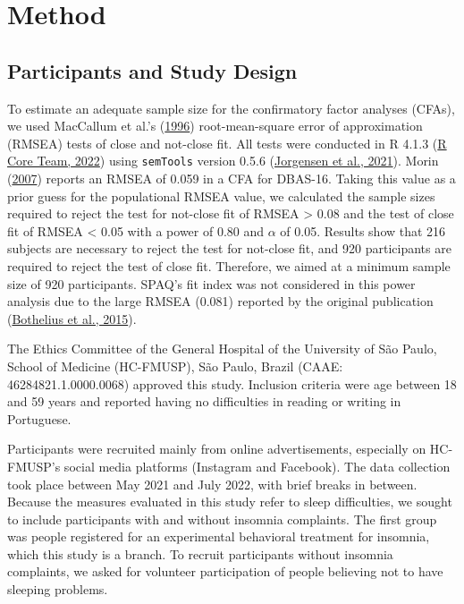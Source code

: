 \documentclass[
  ,doc,11pt, twoside,floatsintext]{apa6}
\begin{document}
\newpage

\hypertarget{method}{%
\section{Method}\label{method}}

\hypertarget{participants-and-study-design}{%
\subsection{Participants and Study Design}\label{participants-and-study-design}}

To estimate an adequate sample size for the confirmatory factor analyses (CFAs), we used MacCallum et al.'s (\protect\hyperlink{ref-maccallum1996}{1996}) root-mean-square error of approximation (RMSEA) tests of close and not-close fit. All tests were conducted in R 4.1.3 (\protect\hyperlink{ref-R-base}{R Core Team, 2022}) using \texttt{semTools} version 0.5.6 (\protect\hyperlink{ref-semtools}{Jorgensen et al., 2021}). Morin (\protect\hyperlink{ref-morin2007a}{2007}) reports an RMSEA of 0.059 in a CFA for DBAS-16. Taking this value as a prior guess for the populational RMSEA value, we calculated the sample sizes required to reject the test for not-close fit of RMSEA \textgreater{} 0.08 and the test of close fit of RMSEA \textless{} 0.05 with a power of 0.80 and \(\alpha\) of 0.05. Results show that 216 subjects are necessary to reject the test for not-close fit, and 920 participants are required to reject the test of close fit. Therefore, we aimed at a minimum sample size of 920 participants. SPAQ's fit index was not considered in this power analysis due to the large RMSEA (0.081) reported by the original publication (\protect\hyperlink{ref-bothelius2015}{Bothelius et al., 2015}).

The Ethics Committee of the General Hospital of the University of São Paulo, School of Medicine (HC-FMUSP), São Paulo, Brazil (CAAE: 46284821.1.0000.0068) approved this study. Inclusion criteria were age between 18 and 59 years and reported having no difficulties in reading or writing in Portuguese.

Participants were recruited mainly from online advertisements, especially on HC-FMUSP's social media platforms (Instagram and Facebook). The data collection took place between May 2021 and July 2022, with brief breaks in between. Because the measures evaluated in this study refer to sleep difficulties, we sought to include participants with and without insomnia complaints. The first group was people registered for an experimental behavioral treatment for insomnia, which this study is a branch. To recruit participants without insomnia complaints, we asked for volunteer participation of people believing not to have sleeping problems.
\end{document}

